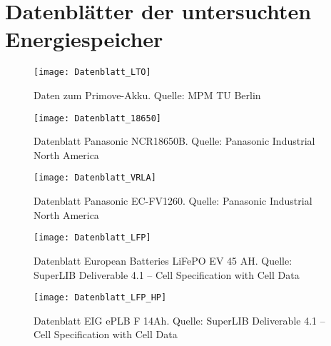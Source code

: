 \appendix
\label{an_Datenblaetter}
\chapter{Datenblätter der untersuchten Energiespeicher}
\begin{figure}[h!]\centering
	\texttt{[image: Datenblatt\_LTO]}
	\caption[Daten zum Primove-Akku]{Daten zum Primove-Akku. Quelle: MPM TU Berlin}
\end{figure}

\begin{figure}\centering
	\texttt{[image: Datenblatt\_18650]}
	\caption[Datenblatt Panasonic NCR18650B]{Datenblatt Panasonic NCR18650B. Quelle: Panasonic Industrial North America}
\end{figure}

\begin{figure}\centering
	\texttt{[image: Datenblatt\_VRLA]}
	\caption[Datenblatt Panasonic EC-FV1260]{Datenblatt Panasonic EC-FV1260. Quelle: Panasonic Industrial North America}
\end{figure}

\begin{figure}\centering
	\texttt{[image: Datenblatt\_LFP]}
	\caption[Datenblatt European Batteries LiFePO EV 45 Ah]{Datenblatt European Batteries LiFePO EV 45 AH. Quelle: SuperLIB Deliverable 4.1 – Cell Specification with Cell Data}
\end{figure}

\begin{figure}\centering
	\texttt{[image: Datenblatt\_LFP\_HP]}
	\caption[Datenblatt EIG ePLB F 14 Ah]{Datenblatt EIG ePLB F 14Ah. Quelle: SuperLIB Deliverable 4.1 – Cell Specification with Cell Data}
\end{figure}